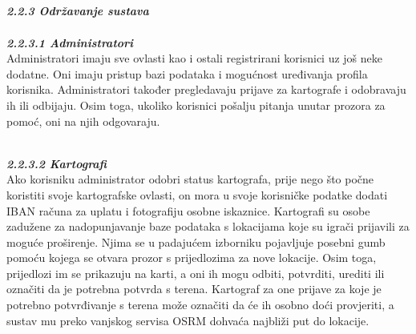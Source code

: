 		
		\textbf{\textit{\\ \\ \\ \\ 2.2.3 Održavanje sustava}}\\
		\textbf{\textit{\\ \small2.2.3.1 Administratori}}\\
		{Administratori imaju sve ovlasti kao i ostali registrirani korisnici uz još neke dodatne. Oni imaju pristup bazi podataka i mogućnost uređivanja profila korisnika. Administratori također pregledavaju prijave za kartografe i odobravaju ih ili odbijaju. Osim toga, ukoliko korisnici pošalju pitanja unutar prozora za pomoć, oni na njih odgovaraju.\\}
		
		\textbf{\textit{\\ \small2.2.3.2 Kartografi}}\\
		{Ako korisniku administrator odobri status kartografa, prije nego što počne koristiti svoje kartografske ovlasti, on mora u svoje korisničke podatke dodati IBAN računa za uplatu i fotografiju osobne iskaznice. Kartografi su osobe zadužene za nadopunjavanje baze podataka s lokacijama koje su igrači prijavili za moguće proširenje. Njima se u padajućem izborniku pojavljuje posebni gumb pomoću kojega se otvara prozor s prijedlozima za nove lokacije. Osim toga, prijedlozi im se prikazuju na karti, a oni ih mogu odbiti, potvrditi, urediti ili označiti da je potrebna potvrda s terena. Kartograf za one prijave za koje je potrebno potvrđivanje s terena može označiti da će ih osobno doći provjeriti, a sustav mu preko vanjskog servisa OSRM dohvaća najbliži put do lokacije.}
		
		
		\eject
	